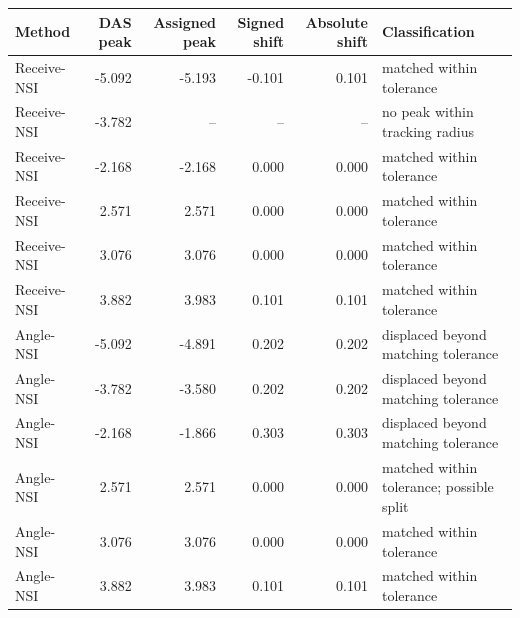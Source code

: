 \begin{tabular}{@{}lrrrrl@{}}
\toprule
Method & DAS peak & Assigned peak & Signed shift & Absolute shift & Classification \\
\midrule
Receive-NSI & -5.092 & -5.193 & -0.101 & 0.101 & matched within tolerance \\
Receive-NSI & -3.782 & -- & -- & -- & no peak within tracking radius \\
Receive-NSI & -2.168 & -2.168 & 0.000 & 0.000 & matched within tolerance \\
Receive-NSI & 2.571 & 2.571 & 0.000 & 0.000 & matched within tolerance \\
Receive-NSI & 3.076 & 3.076 & 0.000 & 0.000 & matched within tolerance \\
Receive-NSI & 3.882 & 3.983 & 0.101 & 0.101 & matched within tolerance \\
Angle-NSI & -5.092 & -4.891 & 0.202 & 0.202 & displaced beyond matching tolerance \\
Angle-NSI & -3.782 & -3.580 & 0.202 & 0.202 & displaced beyond matching tolerance \\
Angle-NSI & -2.168 & -1.866 & 0.303 & 0.303 & displaced beyond matching tolerance \\
Angle-NSI & 2.571 & 2.571 & 0.000 & 0.000 & matched within tolerance; possible split \\
Angle-NSI & 3.076 & 3.076 & 0.000 & 0.000 & matched within tolerance \\
Angle-NSI & 3.882 & 3.983 & 0.101 & 0.101 & matched within tolerance \\
\bottomrule
\end{tabular}
